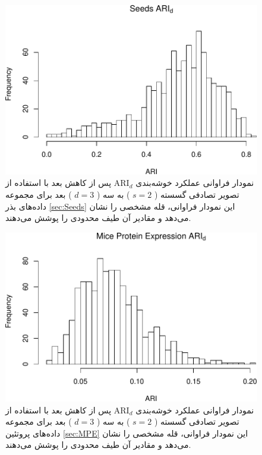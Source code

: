\begin{figure}[H]
\centering
\includegraphics[width=0.7\linewidth]{Report_files/figure-latex/unnamed-chunk-18-5}
\caption{
نمودار فراوانی عملکرد خوشه‌بندی 
$\mathrm{ARI}_d$
پس از کاهش بعد با استفاده از تصویر تصادفی
گسسته (%
$s=2$%
)
به 
سه (%
$d=3$%
)
بعد برای مجموعه داده‌های
بذر
\ref{sec:Seeds}
این نمودار فراوانی،
قله
مشخصی را نشان 
می‌دهد
و مقادیر آن طیف 
محدودی
را پوشش می‌دهند.
}
\end{figure}

\begin{figure}[H]
\centering
\includegraphics[width=0.7\linewidth]{Report_files/figure-latex/unnamed-chunk-18-6}
\caption{
نمودار فراوانی عملکرد خوشه‌بندی 
$\mathrm{ARI}_d$
پس از کاهش بعد با استفاده از تصویر تصادفی
گسسته (%
$s=2$%
)
به
سه (%
$d=3$%
)
بعد برای مجموعه داده‌های
پروتئین
\ref{sec:MPE}
این نمودار فراوانی،
قله
مشخصی را نشان 
می‌دهد
و مقادیر آن طیف 
محدودی
 را پوشش می‌دهند.
}
\end{figure}

